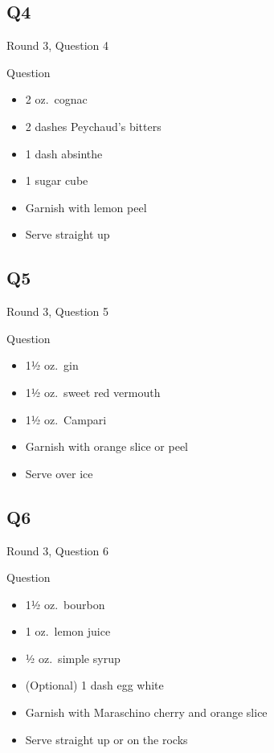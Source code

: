 \documentclass[11pt]{beamer}
\begin{document}
\subsection*{Q4}
\begin{frame}[t]{Round 3, Question 4}
\begin{block}{Question}
\begin{itemize}
\item 2 oz.\ cognac
\item 2 dashes Peychaud's bitters
\item 1 dash absinthe
\item 1 sugar cube
\item Garnish with lemon peel
\item Serve straight up
\end{itemize}
\end{block}
\end{frame}
\subsection*{Q5}
\begin{frame}[t]{Round 3, Question 5}
\begin{block}{Question}
\begin{itemize}
\item 1½ oz.\ gin
\item 1½ oz.\ sweet red vermouth
\item 1½ oz.\ Campari
\item Garnish with orange slice or peel
\item Serve over ice
\end{itemize}
\end{block}
\end{frame}
\subsection*{Q6}
\begin{frame}[t]{Round 3, Question 6}
\begin{block}{Question}
\begin{itemize}
\item 1½ oz.\ bourbon
\item 1 oz.\ lemon juice
\item ½ oz.\ simple syrup
\item (Optional) 1 dash egg white
\item Garnish with Maraschino cherry and orange slice
\item Serve straight up or on the rocks
\end{itemize}
\end{block}
\end{frame}
\end{document}
